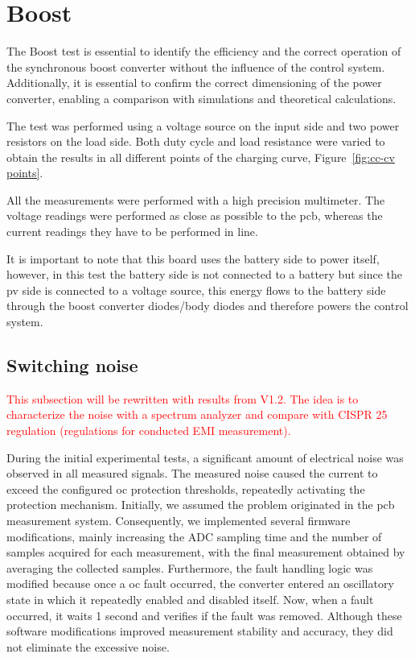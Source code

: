 \section{Boost}
    The Boost test is essential to identify the efficiency and the correct operation of the synchronous boost converter without the influence of the control system. Additionally, it is essential to confirm the correct dimensioning of the power converter, enabling a comparison with simulations and theoretical calculations.

    The test was performed using a voltage source on the input side and two power resistors on the load side. Both duty cycle and load resistance were varied to obtain the results in all different points of the charging curve, Figure~\ref{fig:cc-cv points}.

    All the measurements were performed with a high precision multimeter. The voltage readings were performed as close as possible to the \ac{pcb}, whereas the current readings they have to be performed in line.

    It is important to note that this board uses the battery side to power itself, however, in this test the battery side is not connected to a battery but since the \ac{pv} side is connected to a voltage source, this energy flows to the battery side through the boost converter diodes/body diodes and therefore powers the control system.
        
    \subsection{Switching noise}
        \textcolor{red}{This subsection will be rewritten with results from V1.2. The idea is to characterize the noise with a spectrum analyzer and compare with CISPR 25 regulation (regulations for conducted EMI measurement).}

        During the initial experimental tests, a significant amount of electrical noise was observed in all measured signals. The measured noise caused the current to exceed the configured \ac{oc} protection thresholds, repeatedly activating the protection mechanism. Initially, we assumed the problem originated in the \ac{pcb} measurement system. Consequently, we implemented several firmware modifications, mainly increasing the ADC sampling time and the number of samples acquired for each measurement, with the final measurement obtained by averaging the collected samples. Furthermore, the fault handling logic was modified because once a \ac{oc} fault occurred, the converter entered an oscillatory state in which it repeatedly enabled and disabled itself. Now, when a fault occurred, it waits 1 second and verifies if the fault was removed. Although these software modifications improved measurement stability and accuracy, they did not eliminate the excessive noise.


